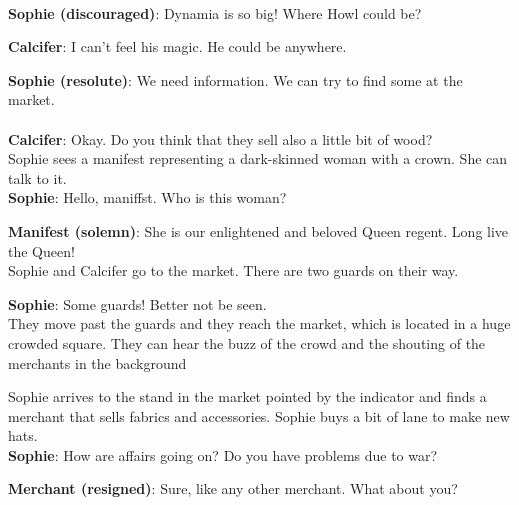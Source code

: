 \noindent \\

\textbf{Sophie (discouraged)}: Dynamia is so big! Where Howl could be?

\textbf{Calcifer}: I can’t feel his magic. He could be anywhere.

\textbf{Sophie (resolute)}: We need information. We can try to find some at the market. \\

\\

\textbf{Calcifer}: Okay. Do you think that they sell also a little bit of wood?\\

\noindent Sophie sees a manifest representing a dark-skinned woman with a crown. She can talk to it.\\

\textbf{Sophie}: Hello, maniffst. Who is this woman?

\textbf{Manifest (solemn)}: She is our enlightened and beloved Queen regent. Long live the Queen!\\

\noindent Sophie and Calcifer go to the market. There are two guards on their way.

\textbf{Sophie}: Some guards! Better not be seen.\\

\noindent They move past the guards and they reach the market, which is located in a huge crowded square.
They can hear the buzz of the crowd and the shouting of the merchants in the background


\noindent Sophie arrives to the stand in the market pointed by the indicator and finds a merchant that sells fabrics and accessories.
Sophie buys a bit of lane to make new hats.\\

\textbf{Sophie}: How are affairs going on? Do you have problems due to war?

\textbf{Merchant (resigned)}: Sure, like any other merchant. What about you?\\

